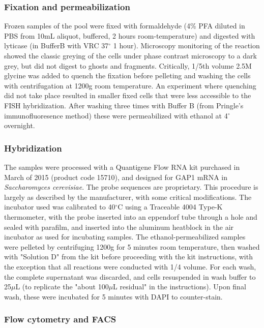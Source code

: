\subsubsection{Fixation and permeabilization}

Frozen samples of the pool were fixed with formaldehyde
(4\% PFA diluted in PBS from 10mL aliquot, 
buffered, 2 hours room-temperature) and digested
with lyticase (in BufferB with VRC 37$^{\circ}$ 1 hour).
Microscopy monitoring of the reaction showed the classic
greying of the cells under phase contrast microscopy to a dark grey, 
but did not digest to ghosts and fragments. 
Critically, 1/5th volume 2.5M glycine was added to quench the 
fixation before pelleting and washing the cells with centrifugation
at 1200g room temperature. An experiment where quenching did not
take place resulted in smaller fixed cells that were less accessible
to the FISH hybridization.
After washing three times with Buffer B (from Pringle's
immunofluoresence method) these were permeabilized with ethanol at
4$^{\circ}$ overnight.

\subsubsection{Hybridization}\label{hybridization}

The samples were processed with a Quantigene Flow RNA kit purchased in
March of 2015 (product code 15710), and designed for GAP1 mRNA in
\emph{Saccharomyces cerevisiae}. The probe sequences are proprietary.
This procedure is largely as described by the manufacturer, with some
critical modifications.
The incubator used was calibrated to 40\(^{\circ}\)C using a Traceable
4004 Type-K thermometer, with the probe inserted into an eppendorf tube
through a hole and sealed with parafilm, and inserted into the aluminum
heatblock in the air incubator as used for incubating samples. 
The ethanol-permeabilized samples were pelleted by centrifuging 
1200g for 5 minutes room temperature, then washed with "Solution D"
from the kit before proceeding with the kit instructions, with the
exception that all reactions were conducted with 1/4 volume. 
For each wash, the complete supernatant was discarded, and cells
resuspended in wash buffer to 25$\mu$L (to replicate the "about
100$\mu$L residual" in the instructions).
Upon final wash, these were incubated for 5 minutes with DAPI
to counter-stain.

\subsubsection{Flow cytometry and FACS}

